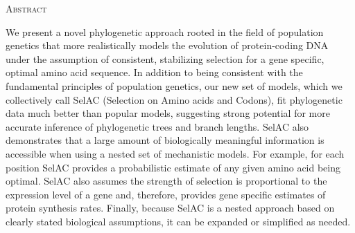 \documentclass[12pt,letterpaper]{article}
\renewcommand{\section}[1]{%
\bigskip
\begin{center}
\begin{Large}
\normalfont\scshape #1
\medskip
\end{Large}
\end{center}}
\begin{document}


\newpage

\section{Abstract}
We present a novel phylogenetic approach rooted in the field of population genetics that more realistically models the evolution of protein-coding DNA under the assumption of consistent, stabilizing selection for a gene specific, optimal amino acid sequence.
In addition to being consistent with the fundamental principles of population genetics, our new set of models, which we collectively call SelAC (Selection on Amino acids and Codons), fit phylogenetic data much better than popular models, suggesting strong potential for more accurate inference of phylogenetic trees and branch lengths.
SelAC also demonstrates that a large amount of biologically meaningful information is accessible when using a nested set of mechanistic models.
For example, for each position SelAC provides a probabilistic estimate of any given amino acid being optimal.
SelAC also assumes the strength of selection is proportional to the expression level of a gene and, therefore, provides gene specific estimates of protein synthesis rates.
Finally, because SelAC is a nested approach based on clearly stated biological assumptions, it can be expanded or simplified as needed.

\newpage
\end{document}
